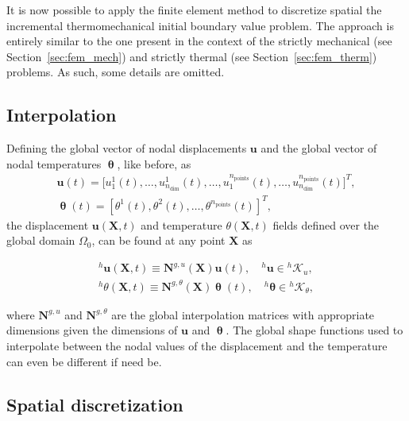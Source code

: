 It is now possible to apply the finite element method to discretize spatial the incremental thermomechanical initial boundary value problem.
The approach is entirely similar to the one present in the context of the strictly mechanical (see Section~\ref{sec:fem_mech}) and strictly thermal (see Section~\ref{sec:fem_therm}) problems.
As such, some details are omitted.

\subsection{Interpolation}

Defining the global vector of nodal displacements \(\mathbf u\) and the global vector of nodal temperatures \(\bm \uptheta\), like before, as
\begin{gather}
    \mathbf u(t) = \Big[ u_1^1(t),\dots,u^1_{n_\text{dim}}(t),\dots, u_1^{n_\text{points}}(t),\dots,u^{n_\text{points}}_{n_\text{dim}}(t)\Big]^T,\\
    \bm \uptheta(t) = \left[ \theta^1(t), \theta^2(t), \dots, \theta^{n_\text{points}}(t)\right]^T,
\end{gather}
the displacement $\bm u(\bm X, t)$ and temperature \(\theta(\bm X, t)\) fields defined over the global domain $\Omega_0$, can be found at any point $\bm X$ as
\begin{highlight}[innertopmargin=-5pt]
    \begin{gather}
        ^h\bm u(\bm X, t) \equiv \mathbf N^{g,u}(\bm X)\mathbf u(t),\quad ^h\bm u\in {}^h\mathscr{K}_u,\\
        ^h\theta(\bm X, t) \equiv \mathbf N^{g,\theta}(\bm X)\bm \uptheta(t),\quad ^h\bm \theta\in {}^h\mathscr{K}_\theta,
    \end{gather}
\end{highlight}
where \(\mathbf N^{g,u}\) and \(\mathbf N^{g,\theta}\) are the global interpolation matrices with appropriate dimensions given the dimensions of \(\mathbf u\) and \(\bm \uptheta\).
The global shape functions used to interpolate between the nodal values of the displacement and the temperature can even be different if need be.

\subsection{Spatial discretization} \label{sec:spatial_discretization}

